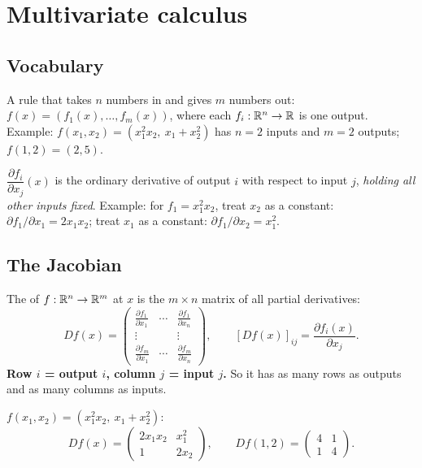 \section{Multivariate calculus}

\subsection{Vocabulary}

\begin{defn}[A function $f:\R^n\to\R^m$]
A rule that takes $n$ numbers in and gives $m$ numbers out: $f(x) = (f_1(x),\dots,f_m(x))$, where each $f_i:\mathbb{R}^n\to\mathbb{R}$ is one output.
Example: $f(x_1,x_2) = (x_1^2x_2,\ x_1+x_2^2)$ has $n=2$ inputs and $m=2$ outputs; $f(1,2) = (2,5)$.
\end{defn}

\begin{defn}
$\dfrac{\partial f_i}{\partial x_j}(x)$ is the ordinary derivative of output $i$ with respect to input $j$, \emph{holding all other inputs fixed}.
Example: for $f_1 = x_1^2x_2$, treat $x_2$ as a constant: $\partial f_1/\partial x_1 = 2x_1x_2$; treat $x_1$ as a constant: $\partial f_1/\partial x_2 = x_1^2$.
\end{defn}

\subsection{The Jacobian}

\begin{defn}[Jacobian]
The  of $f:\R^n\to\R^m$ at $x$ is the $m\times n$ matrix of all partial derivatives:
\[ Df(x) = \begin{pmatrix} \frac{\partial f_1}{\partial x_1} & \cdots & \frac{\partial f_1}{\partial x_n}\\ \vdots & & \vdots\\
\frac{\partial f_m}{\partial x_1} & \cdots & \frac{\partial f_m}{\partial x_n}\end{pmatrix},\qquad [Df(x)]_{ij} = \frac{\partial f_i(x)}{\partial x_j}. \]
\textbf{Row $i$ = output $i$, column $j$ = input $j$.} So it has as many rows as outputs and as many columns as inputs.
\end{defn}

\begin{example}
$f(x_1,x_2) = (x_1^2x_2,\ x_1+x_2^2)$:
\[ Df(x) = \begin{pmatrix} 2x_1x_2 & x_1^2\\ 1 & 2x_2\end{pmatrix},\qquad Df(1,2) = \begin{pmatrix}4&1\\1&4\end{pmatrix}. \]
\end{example}

